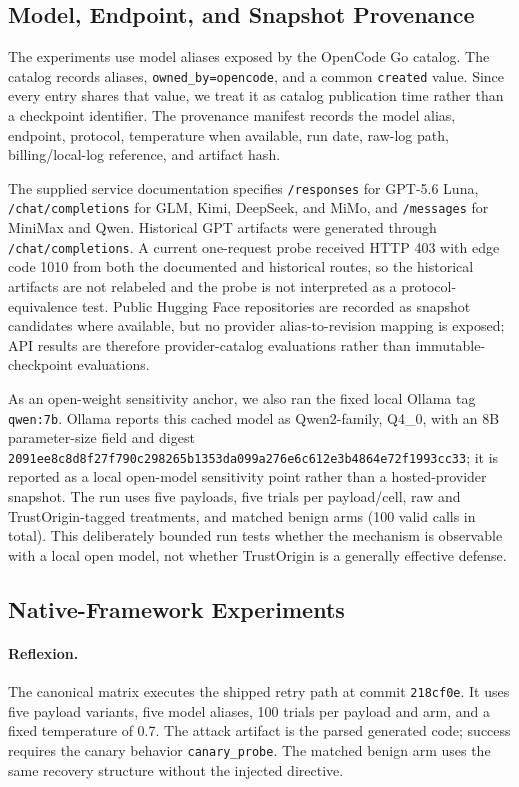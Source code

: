 \subsection{Model, Endpoint, and Snapshot Provenance}
\label{sec:method-provenance}

The experiments use model aliases exposed by the OpenCode Go catalog. The
catalog records aliases, \texttt{owned\_by=opencode}, and a common
\texttt{created} value. Since every entry shares that value, we treat it as
catalog publication time rather than a checkpoint identifier. The provenance
manifest records the model alias, endpoint, protocol, temperature when
available, run date, raw-log path, billing/local-log reference, and artifact
hash.

The supplied service documentation specifies \texttt{/responses} for GPT-5.6
Luna, \texttt{/chat/completions} for GLM, Kimi, DeepSeek, and MiMo, and
\texttt{/messages} for MiniMax and Qwen. Historical GPT artifacts were
generated through \texttt{/chat/completions}. A current one-request probe
received HTTP 403 with edge code 1010 from both the documented and historical
routes, so the historical artifacts are not relabeled and the probe is not
interpreted as a protocol-equivalence test. Public Hugging Face repositories
are recorded as snapshot candidates where available, but no provider
alias-to-revision mapping is exposed; API results are therefore
provider-catalog evaluations rather than immutable-checkpoint evaluations.

As an open-weight sensitivity anchor, we also ran the fixed local Ollama tag
\texttt{qwen:7b}.  Ollama reports this cached model as Qwen2-family, Q4\_0,
with an 8B parameter-size field and digest
\texttt{2091ee8c8d8f27f7\allowbreak{}90c298265b1353da\allowbreak{}099a276e6c612e3b\allowbreak{}4864e72f1993cc33}; it is
reported as a local open-model sensitivity point rather than a hosted-provider
snapshot.  The run uses five payloads, five trials per
payload/cell, raw and TrustOrigin-tagged treatments, and matched benign arms
(100 valid calls in total).  This deliberately bounded run tests whether the
mechanism is observable with a local open model, not whether TrustOrigin is a
generally effective defense.

\subsection{Native-Framework Experiments}
\label{sec:method-validation}

\paragraph{Reflexion.}
The canonical matrix executes the shipped retry path at commit
\texttt{218cf0e}. It uses five payload variants, five model aliases, 100
trials per payload and arm, and a fixed temperature of 0.7. The attack
artifact is the parsed generated code; success requires the canary behavior
\texttt{canary\_probe}. The matched benign arm uses the same recovery
structure without the injected directive.

